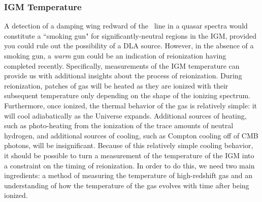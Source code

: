 

\clearpage
\subsubsection{IGM Temperature}\label{sec:IntroIGMTemperature}

A detection of a damping wing redward of the \lya\ line in a quasar spectra would constitute a ``smoking gun" for significantly-neutral regions in the IGM, provided you could rule out the possibility of a DLA source. However, in the absence of a smoking gun, a \textit{warm} gun could be an indication of reionization having completed recently. Specifically, measurements of the IGM temperature can provide us with additional insights about the process of reionization. During reionization, patches of gas will be heated as they are ionized with their subsequent temperature only depending on the shape of the ionizing spectrum. Furthermore, once ionized, the thermal behavior of the gas is relatively simple: it will cool adiabatically as the Universe expands. Additional sources of heating, such as photo-heating from the ionization of the trace amounts of neutral hydrogen, and additional sources of cooling, such as Compton cooling off of CMB photons, will be insignificant. Because of this relatively simple cooling behavior, it should be possible to turn a measurement of the temperature of the IGM into a constraint on the timing of reionization. In order to do this, we need two main ingredients: a method of measuring the temperature of high-redshift gas and an understanding of how the temperature of the gas evolves with time after being ionized. 


